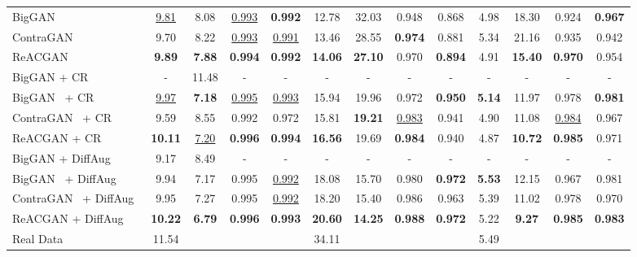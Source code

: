 \documentclass{article}
\begin{document}
\begin{table}[t!]
{\begin{tabular}{lcccccccccccc}
BigGAN~\cite{Brock2019LargeSG} & \underline{9.81} & 8.08 & \underline{0.993} & \textbf{0.992} & 12.78 & 32.03 & 0.948 & 0.868 & 4.98 & 18.30 & 0.924 & \textbf{0.967}\\
ContraGAN~\cite{kang2020contragan} & 9.70 & 8.22 & \underline{0.993} & \underline{0.991} & 13.46 & 28.55 & \textbf{0.974} & 0.881 & 5.34 & 21.16 & 0.935 & 0.942 \\
\rowcolor{yellow!20}ReACGAN & \textbf{9.89} & \textbf{7.88} & \textbf{0.994} & \textbf{0.992} & \textbf{14.06} & \textbf{27.10} & 0.970 & \textbf{0.894} & 4.91 & \textbf{15.40} & \textbf{0.970} & 0.954\\
\midrule
BigGAN + CR~\cite{Zhang2019ConsistencyRF} & - & 11.48 & - & - & - & - & - & - & - & - & - & -\\
BigGAN~\cite{Brock2019LargeSG} + CR~\cite{Zhang2019ConsistencyRF} & \underline{9.97} & \textbf{7.18} & \underline{0.995} & \underline{0.993} & 15.94 & 19.96 & 0.972 & \textbf{0.950} & \textbf{5.14} & 11.97 & 0.978 & \textbf{0.981} \\
ContraGAN~\cite{kang2020contragan} + CR~\cite{Zhang2019ConsistencyRF} & 9.59 & 8.55 & 0.992 & 0.972 & 15.81 & \textbf{19.21} & \underline{0.983} & 0.941 & 4.90 & 11.08 &  \underline{0.984} & 0.967 \\
\rowcolor{yellow!20}ReACGAN + CR~\cite{Zhang2019ConsistencyRF} & \textbf{10.11} & \underline{7.20} & \textbf{0.996} & \textbf{0.994} & \textbf{16.56} & 19.69 & \textbf{0.984} & 0.940  & 4.87 & \textbf{10.72} & \textbf{0.985} & 0.971 \\
\midrule
BigGAN + DiffAug~\cite{zhao2020differentiable} & 9.17 & 8.49 & - & - & - & - & - & - & - & - & - & -\\
BigGAN~\cite{Brock2019LargeSG} + DiffAug~\cite{zhao2020differentiable} & 9.94 & 7.17 & 0.995 & \underline{0.992} & 18.08 & 15.70 & 0.980 & \textbf{0.972} & \textbf{5.53} & 12.15 & 0.967 & 0.981\\
ContraGAN~\cite{kang2020contragan} + DiffAug~\cite{zhao2020differentiable} & 9.95 & 7.27 & 0.995 & \underline{0.992} & 18.20 & 15.40 & 0.986 & 0.963 & 5.39 & 11.02 & 0.978 & 0.970 \\ 
\rowcolor{yellow!20}ReACGAN + DiffAug~\cite{zhao2020differentiable} & \textbf{10.22} & \textbf{6.79} & \textbf{0.996} & \textbf{0.993} & \textbf{20.60} & \textbf{14.25} & \textbf{0.988} & \textbf{0.972} & 5.22 & \textbf{9.27} & \textbf{0.985} & \textbf{0.983} \\
\cmidrule[1.0pt]{1-13}
Real Data & 11.54 &  &  &  & 34.11 &  &  &  & 5.49 &  &  &  \\ \cmidrule[1.0pt]{1-13}
\end{tabular}}
\label{table:main_table1}
\end{table}
\end{document}
